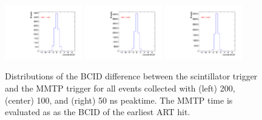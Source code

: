 \begin{figure}[!htpb]
  \begin{center}
    \includegraphics[width=0.3\textwidth]{figures/gbtanalysis3530/earliest_BCID.pdf}
    \includegraphics[width=0.3\textwidth]{figures/gbtanalysis3527/earliest_BCID.pdf}
    \includegraphics[width=0.3\textwidth]{figures/gbtanalysis3528/earliest_BCID.pdf}
  \end{center}
  \vspace{-10pt}
  \caption{
Distributions of the BCID difference between the scintillator trigger and the MMTP trigger
 for all events collected with (left) 200, (center) 100, and  (right) 50 ns peaktime.
 The MMTP  time is evaluated as as the BCID of the earliest ART hit.}
  \label{fig:integ_avg_earliest}
\end{figure}


